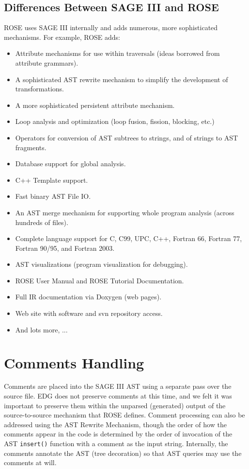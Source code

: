 \subsection{Differences Between SAGE III and ROSE}
   ROSE uses SAGE III internally and adds numerous, more sophisticated mechanisms.
For example, ROSE adds:
\begin{itemize}
    \item Attribute mechanisms for use within traversals (ideas borrowed 
          from attribute grammars).
    \item A sophisticated AST rewrite mechanism to simplify the development 
          of transformations.
    \item A more sophisticated persistent attribute mechanism.
    \item Loop analysis and optimization (loop fusion, fission, blocking, etc.)
    \item Operators for conversion of AST subtrees to strings, and of strings 
          to AST fragments.
    \item Database support for global analysis.
    \item C++ Template support.
    \item Fast binary AST File I\/O.
    \item An AST merge mechanism for supporting whole program analysis
          (across hundreds of files).
    \item Complete language support for C, C99, UPC, C++, Fortran 66, Fortran 77, 
          Fortran 90/95, and Fortran 2003.
    \item AST visualizations (program visualization for debugging).
    \item ROSE User Manual and ROSE Tutorial Documentation.
    \item Full IR documentation via Doxygen (web pages).
    \item Web site with software and svn repository access.
    \item And lots more, ...
\end{itemize}

\section {Comments Handling}

    Comments are placed into the SAGE III AST using a separate pass over the source file.
EDG does not preserve comments at this time, and we felt it was important to preserve them
within the unparsed (generated) output of the source-to-source mechanism that ROSE defines.
Comment processing can also be addressed using the AST Rewrite Mechanism, though
the order of how the comments appear in the code is determined by the order of 
invocation of the AST {\tt insert()} function with a comment as the input string.
Internally, the comments annotate the AST (tree decoration) so that AST queries may use 
the comments at will.

